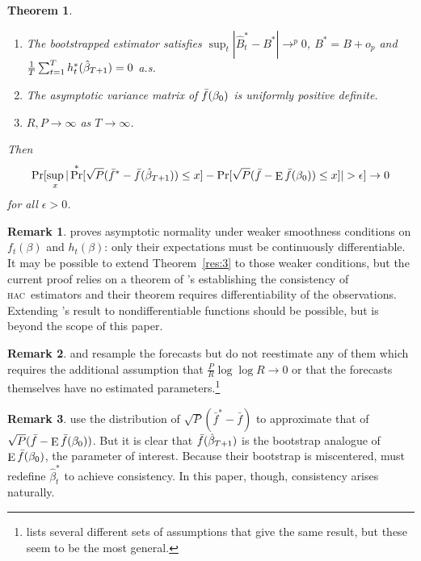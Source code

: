 \documentclass[11pt,fleqn]{article}
\newcommand\citepos[2][]{\citeauthor{#2}'s \citeyearpar[#1]{#2}}
\newtheorem{thm}{Theorem}
\theoremstyle{definition}
\newtheorem{rem}{Remark}
\DeclareMathOperator{\E}{E}
\DeclareMathOperator{\pr}{Pr}
\newcommand{\btrue}[1][]{\if#1*\hat\beta_{T+1}\else\beta_0\fi}
\newcommand{\hac}{\textsc{hac}}
\begin{document}
\begin{thm}
\begin{enumerate}
    moving blocks, circular blocks, or stationary bootstrap with block
    lengths drawn from the geometric distribution.  The (expected)
    block length $b$ satisfies $b \to \infty$ and $\frac{b}{P} \to 0$.
  \item The bootstrapped estimator satisfies $\sup_t |\hat{B}_t^{*} -
    B^{*}| \to^p 0$, $B^{*} = B + o_p$ and $\frac1T \sum_{t=1}^T
    h_t^*(\btrue[*]) = 0$ a.s.
  \item The asymptotic variance matrix of $\bar{f}(\btrue)$ is
    uniformly positive definite.
  \item $R, P \to \infty$ as $T \to \infty$.
  \end{enumerate}
  Then
  \begin{equation}
    \pr[\sup_x | \pr^*[\sqrt{P} (\bar{f}^* - \bar{f}(\btrue[*]))
        \leq x] - \pr[\sqrt{P}( \bar{f} - \E \bar{f}(\btrue)) \leq x] | >
      \epsilon] \to 0
  \end{equation}
  for all $\epsilon > 0$.
\end{thm}

\begin{rem}
  \citet{Mcc:00} proves asymptotic normality under weaker smoothness
  conditions on $f_t(\beta)$ and $h_t(\beta)$: only their expectations
  must be continuously differentiable.  It may be possible to extend
  Theorem~\ref{res:3} to those weaker conditions, but the current
  proof relies on a theorem of \citepos{JoD:00} establishing the
  consistency of \hac\ estimators and their theorem requires differentiability of
  the observations.  Extending \citepos{JoD:00} result to
  nondifferentiable functions should be possible, but is beyond the
  scope of this paper.
\end{rem}

\begin{rem}
  \citet{Whi:00} and \citet{Han:05} resample the forecasts but do not
  reestimate any of them which requires the additional assumption that
  $\tfrac{P}{R} \log \log R \to 0$ or that the forecasts themselves
  have no estimated parameters.\footnote{\citet{Whi:00} lists several
    different sets of assumptions that give the same result, but these
    seem to be the most general.}
\end{rem}

\begin{rem}
  \citet{CoS:07} use the distribution of $\sqrt{P}(\bar{f}^{*} -
  \bar{f})$ to approximate that of $\sqrt{P}(\bar{f} - \E
  \bar{f}(\btrue))$.  But it is clear that $\bar{f}(\btrue[*])$
  is the bootstrap analogue of $\E \bar{f}(\btrue)$, the parameter of
  interest.  Because their bootstrap is miscentered, \citet{CoS:07}
  must redefine $\hat{\beta}_t^{*}$ to achieve consistency.  In this
  paper, though, consistency arises naturally.
\end{rem}
\end{document}
